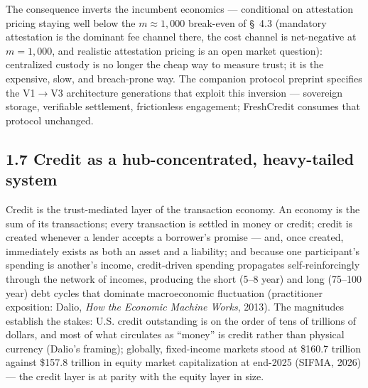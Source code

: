 \documentclass[
]{article}
\begin{document}
The consequence inverts the incumbent economics --- conditional on
attestation pricing staying well below the \(m \approx 1{,}000\)
break-even of §~4.3 (mandatory attestation is the dominant fee channel
there, the cost channel is net-negative at \(m = 1{,}000\), and
realistic attestation pricing is an open market question): centralized
custody is no longer the cheap way to measure trust; it is the
expensive, slow, and breach-prone way. The companion protocol preprint
specifies the V1\(\rightarrow\)V3 architecture generations that exploit
this inversion --- sovereign storage, verifiable settlement,
frictionless engagement; FreshCredit consumes that protocol unchanged.

\subsection{1.7 Credit as a hub-concentrated, heavy-tailed
system}\label{credit-as-a-hub-concentrated-heavy-tailed-system}

Credit is the trust-mediated layer of the transaction economy. An
economy is the sum of its transactions; every transaction is settled in
money or credit; credit is created whenever a lender accepts a
borrower's promise --- and, once created, immediately exists as both an
asset and a liability; and because one participant's spending is
another's income, credit-driven spending propagates self-reinforcingly
through the network of incomes, producing the short (5--8 year) and long
(75--100 year) debt cycles that dominate macroeconomic fluctuation
(practitioner exposition: Dalio, \emph{How the Economic Machine Works},
2013). The magnitudes establish the stakes: U.S. credit outstanding is
on the order of tens of trillions of dollars, and most of what
circulates as ``money'' is credit rather than physical currency (Dalio's
framing); globally, fixed-income markets stood at \$160.7 trillion
against \$157.8 trillion in equity market capitalization at end-2025
(SIFMA, 2026) --- the credit layer is at parity with the equity layer in
size.
\end{document}
